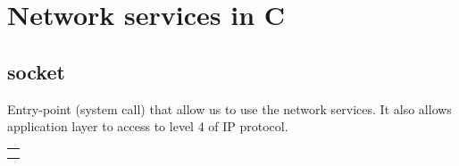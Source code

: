 \chapter{Network services in C}
\section{socket}\label{socket}
Entry-point (system call) that allow us to use the network services. It also allows application layer to access to level 4 of IP protocol. 
\begin{center}
\begin{tabular}{c}
\begin{lstlisting}[linewidth=270pt, basicstyle=\footnotesize\sffamily,]
#include <sys/types.h>
#include <sys/socket.h>

int socket(int domain, int type, int protocol);\\
\end{lstlisting}
\end{tabular}
\end{center}

